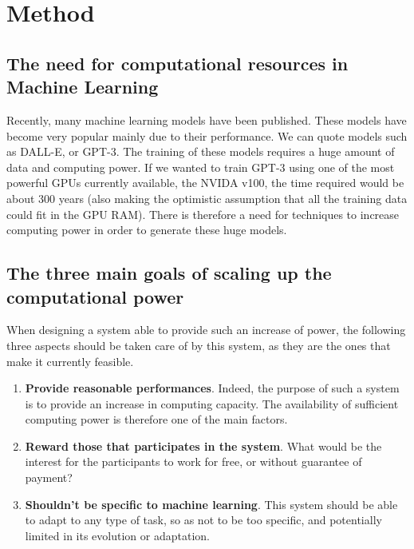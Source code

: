\documentclass{article}
\begin{document}
\section{Method}
\subsection{The need for computational resources in Machine Learning}
Recently, many machine learning models have been published. These models have become very popular mainly due to their
performance. We can quote models such as DALL-E, or GPT-3. The training of these models requires a huge amount of data
and computing power. If we wanted to train GPT-3 using one of the most powerful GPUs currently available,
the NVIDA v100, the time required would be about 300 years (also making the optimistic assumption that all the
training data could fit in the GPU RAM). There is therefore a need for techniques to increase computing power in order
to generate these huge models.
\subsection{The three main goals of scaling up the computational power}
When designing a system able to provide such an increase of power, the following three aspects should be taken care of
by this system, as they are the ones that make it currently feasible.
\begin{enumerate}
    \item \textbf{Provide reasonable performances}. Indeed, the purpose of such a system is to provide an increase in computing
     capacity. The availability of sufficient computing power is therefore one of the main factors.
    \item \textbf{Reward those that participates in the system}. What would be the interest for the participants to work for
     free, or without guarantee of payment?
    \item \textbf{Shouldn't be specific to machine learning}. This system should be able to adapt to any type of task, so as not
     to be too specific, and potentially limited in its evolution or adaptation.
\end{enumerate}
\end{document}
